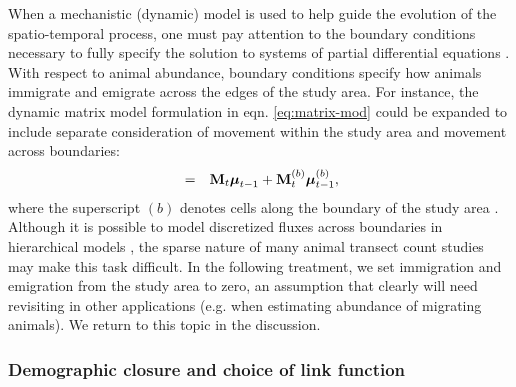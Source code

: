 \documentclass[times,mee,doublespace,]{besauth2}
\begin{document}
When a mechanistic (dynamic) model is used to help guide the evolution of the spatio-temporal process, one must pay attention to the boundary conditions necessary to fully specify the solution to systems of partial differential equations \citep[see e.g.][]{Haberman1998}.  With respect to animal abundance, boundary conditions specify how animals immigrate and emigrate across the edges of the study area.  For instance, the dynamic matrix model formulation in eqn. \ref{eq:matrix-mod} could be expanded to include separate consideration of movement within the study area and movement across boundaries:
\begin{eqnarray*}
[\boldsymbol{\mu}_t | \boldsymbol{\mu}_{t-1},\boldsymbol{\theta}] & = & {\bf M}_t  \boldsymbol{\mu}_{t-1} + {\bf M}_t^{(b)} \boldsymbol{\mu}_{t-1}^{(b)},
\end{eqnarray*}
where the superscript $(b)$ denotes cells along the boundary of the study area \citep[][Section 6.3.2]{CressieWikle2011}.   Although it is possible to model discretized fluxes across boundaries in hierarchical models \citep[see e.g.][]{WikleEtAl2003b}, the sparse nature of many animal transect count studies may make this task difficult.  In the following treatment, we set immigration and emigration from the study area to zero, an assumption that clearly will need revisiting in other applications (e.g. when estimating abundance of migrating animals).  We return to this topic in the discussion.

\subsubsection{Demographic closure and choice of link function}
\end{document}
